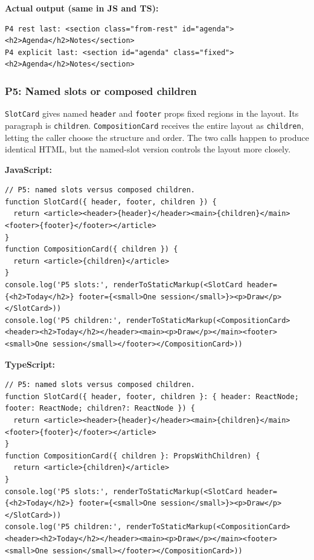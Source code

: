 \documentclass[
  11pt,
]{article}
\newcommand{\passthrough}[1]{#1}
\begin{document}
\textbf{Actual output (same in JS and TS):}

\begin{lstlisting}
P4 rest last: <section class="from-rest" id="agenda"><h2>Agenda</h2>Notes</section>
P4 explicit last: <section id="agenda" class="fixed"><h2>Agenda</h2>Notes</section>
\end{lstlisting}

\subsubsection{P5: Named slots or composed
children}\label{p5-named-slots-or-composed-children}

\passthrough{\lstinline!SlotCard!} gives named
\passthrough{\lstinline!header!} and \passthrough{\lstinline!footer!}
props fixed regions in the layout. Its paragraph is
\passthrough{\lstinline!children!}.
\passthrough{\lstinline!CompositionCard!} receives the entire layout as
\passthrough{\lstinline!children!}, letting the caller choose the
structure and order. The two calls happen to produce identical HTML, but
the named-slot version controls the layout more closely.

\textbf{JavaScript:}

\begin{lstlisting}
// P5: named slots versus composed children.
function SlotCard({ header, footer, children }) {
  return <article><header>{header}</header><main>{children}</main><footer>{footer}</footer></article>
}
function CompositionCard({ children }) {
  return <article>{children}</article>
}
console.log('P5 slots:', renderToStaticMarkup(<SlotCard header={<h2>Today</h2>} footer={<small>One session</small>}><p>Draw</p></SlotCard>))
console.log('P5 children:', renderToStaticMarkup(<CompositionCard><header><h2>Today</h2></header><main><p>Draw</p></main><footer><small>One session</small></footer></CompositionCard>))
\end{lstlisting}

\textbf{TypeScript:}

\begin{lstlisting}
// P5: named slots versus composed children.
function SlotCard({ header, footer, children }: { header: ReactNode; footer: ReactNode; children?: ReactNode }) {
  return <article><header>{header}</header><main>{children}</main><footer>{footer}</footer></article>
}
function CompositionCard({ children }: PropsWithChildren) {
  return <article>{children}</article>
}
console.log('P5 slots:', renderToStaticMarkup(<SlotCard header={<h2>Today</h2>} footer={<small>One session</small>}><p>Draw</p></SlotCard>))
console.log('P5 children:', renderToStaticMarkup(<CompositionCard><header><h2>Today</h2></header><main><p>Draw</p></main><footer><small>One session</small></footer></CompositionCard>))
\end{lstlisting}
\end{document}
